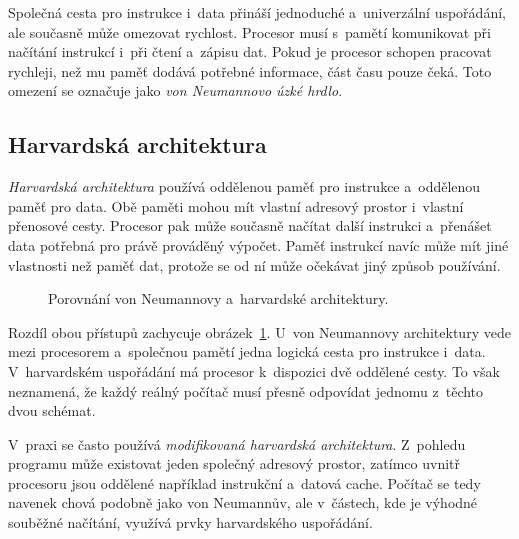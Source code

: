 Společná cesta pro instrukce i~data přináší jednoduché a~univerzální uspořádání, ale současně může omezovat rychlost. Procesor musí s~pamětí komunikovat při načítání instrukcí i~při čtení a~zápisu dat. Pokud je procesor schopen pracovat rychleji, než mu paměť dodává potřebné informace, část času pouze čeká. Toto omezení se označuje jako \emph{von Neumannovo úzké hrdlo}.


\subsection{Harvardská architektura}

\emph{Harvardská architektura} používá oddělenou paměť pro instrukce a~oddělenou paměť pro data. Obě paměti mohou mít vlastní adresový prostor i~vlastní přenosové cesty. Procesor pak může současně načítat další instrukci a~přenášet data potřebná pro právě prováděný výpočet. Paměť instrukcí navíc může mít jiné vlastnosti než paměť dat, protože se od ní může očekávat jiný způsob používání.

\begin{figure}[ht]
    \centering
    
    \caption{Porovnání von Neumannovy a~harvardské architektury.}
    \label{fig:hw-architektury}
\end{figure}

Rozdíl obou přístupů zachycuje obrázek~\ref{fig:hw-architektury}. U~von Neumannovy architektury vede mezi procesorem a~společnou pamětí jedna logická cesta pro instrukce i~data. V~harvardském uspořádání má procesor k~dispozici dvě oddělené cesty. To však neznamená, že každý reálný počítač musí přesně odpovídat jednomu z~těchto dvou schémat.

V~praxi se často používá \emph{modifikovaná harvardská architektura}. Z~pohledu programu může existovat jeden společný adresový prostor, zatímco uvnitř procesoru jsou oddělené například instrukční a~datová cache. Počítač se tedy navenek chová podobně jako von Neumannův, ale v~částech, kde je výhodné souběžné načítání, využívá prvky harvardského uspořádání.

